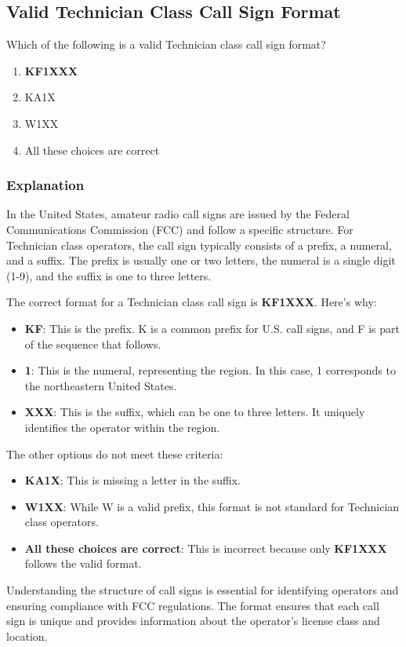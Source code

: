 \subsection{Valid Technician Class Call Sign Format}
\label{T1C05}

\begin{tcolorbox}[colback=gray!10!white,colframe=black!75!black,title=T1C05]
Which of the following is a valid Technician class call sign format?
\begin{enumerate}[label=\Alph*)]
    \item \textbf{KF1XXX}
    \item KA1X
    \item W1XX
    \item All these choices are correct
\end{enumerate}
\end{tcolorbox}

\subsubsection{Explanation}
In the United States, amateur radio call signs are issued by the Federal Communications Commission (FCC) and follow a specific structure. For Technician class operators, the call sign typically consists of a prefix, a numeral, and a suffix. The prefix is usually one or two letters, the numeral is a single digit (1-9), and the suffix is one to three letters. 

The correct format for a Technician class call sign is \textbf{KF1XXX}. Here's why:
\begin{itemize}
    \item \textbf{KF}: This is the prefix. K is a common prefix for U.S. call signs, and F is part of the sequence that follows.
    \item \textbf{1}: This is the numeral, representing the region. In this case, 1 corresponds to the northeastern United States.
    \item \textbf{XXX}: This is the suffix, which can be one to three letters. It uniquely identifies the operator within the region.
\end{itemize}

The other options do not meet these criteria:
\begin{itemize}
    \item \textbf{KA1X}: This is missing a letter in the suffix.
    \item \textbf{W1XX}: While W is a valid prefix, this format is not standard for Technician class operators.
    \item \textbf{All these choices are correct}: This is incorrect because only \textbf{KF1XXX} follows the valid format.
\end{itemize}

Understanding the structure of call signs is essential for identifying operators and ensuring compliance with FCC regulations. The format ensures that each call sign is unique and provides information about the operator's license class and location.

